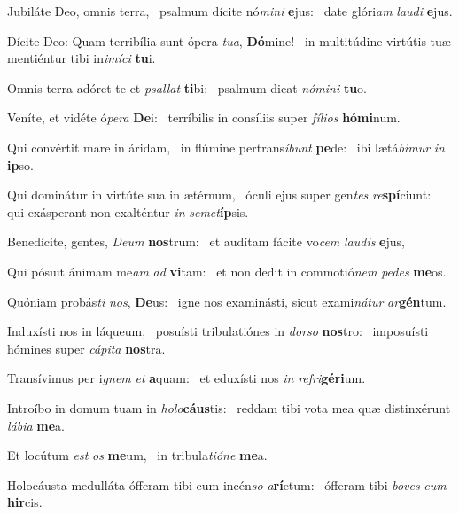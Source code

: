 \item Jubiláte Deo, omnis terra,~\pscross{} psalmum dícite nó\textit{mini} \textbf{e}jus:~\psstar{} date glóri\textit{am} \textit{laudi} \textbf{e}jus.
\item Dícite Deo: Quam terribília sunt ópera \textit{tua}, \textbf{Dó}mine!~\psstar{} in multitúdine virtútis tuæ mentiéntur tibi in\textit{imíci} \textbf{tu}i.
\item Omnis terra adóret te et \textit{psallat} \textbf{ti}bi:~\psstar{} psalmum dicat \textit{nómini} \textbf{tu}o.
\item Veníte, et vidéte ó\textit{pera} \textbf{De}i:~\psstar{} terríbilis in consíliis super \textit{fílios} \textbf{hó}\textbf{mi}num.
\item Qui convértit mare in áridam,~\pscross{} in flúmine pertrans\textit{íbunt} \textbf{pe}de:~\psstar{} ibi lætá\textit{bimur} \textit{in} \textbf{ip}so.
\item Qui dominátur in virtúte sua in ætérnum,~\pscross{} óculi ejus super gen\textit{tes} \textit{re}\textbf{spí}ciunt:~\psstar{} qui exásperant non exalténtur \textit{in} \textit{semet}\textbf{íp}sis.
\item Benedícite, gentes, \textit{Deum} \textbf{nos}trum:~\psstar{} et audítam fácite vo\textit{cem} \textit{laudis} \textbf{e}jus,
\item Qui pósuit ánimam me\textit{am} \textit{ad} \textbf{vi}tam:~\psstar{} et non dedit in commotió\textit{nem} \textit{pedes} \textbf{me}os.
\item Quóniam probás\textit{ti} \textit{nos}, \textbf{De}us:~\psstar{} igne nos examinásti, sicut exami\textit{nátur} \textit{ar}\textbf{gén}tum.
\item Induxísti nos in láqueum,~\pscross{} posuísti tribulatiónes in \textit{dorso} \textbf{nos}tro:~\psstar{} imposuísti hómines super \textit{cápita} \textbf{nos}tra.
\item Transívimus per i\textit{gnem} \textit{et} \textbf{a}quam:~\psstar{} et eduxísti nos \textit{in} \textit{refri}\textbf{gé}\textbf{ri}um.
\item Introíbo in domum tuam in \textit{holo}\textbf{cáus}tis:~\psstar{} reddam tibi vota mea quæ distinxérunt \textit{lábia} \textbf{me}a.
\item Et locútum \textit{est} \textit{os} \textbf{me}um,~\psstar{} in tribula\textit{tióne} \textbf{me}a.
\item Holocáusta medulláta ófferam tibi cum incén\textit{so} \textit{a}\textbf{rí}etum:~\psstar{} ófferam tibi \textit{boves} \textit{cum} \textbf{hir}cis.
